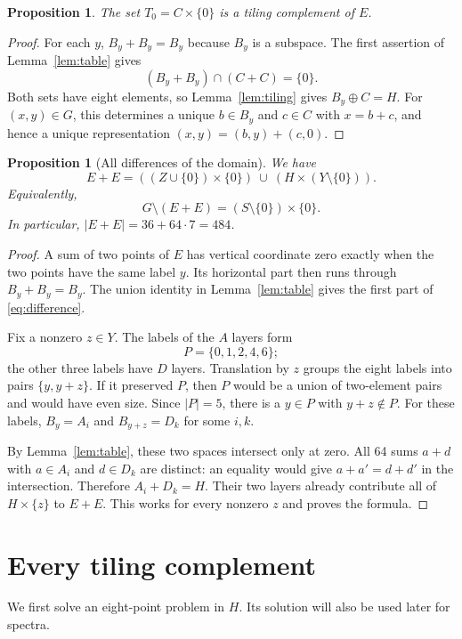 \documentclass[11pt]{article}
\numberwithin{equation}{section}
\newtheorem{proposition}[theorem]{Proposition}
\theoremstyle{definition}
\theoremstyle{remark}\newtheorem{remark}[theorem]{Remark}
\begin{document}
\begin{proposition}\label{prop:tile}
The set $T_0=C\times\{0\}$ is a tiling complement of $E$.
\end{proposition}
\begin{proof}
For each $y$, $B_y+B_y=B_y$ because $B_y$ is a subspace. The first assertion of Lemma~\ref{lem:table} gives
\[
 (B_y+B_y)\cap(C+C)=\{0\}.
\]
Both sets have eight elements, so Lemma~\ref{lem:tiling} gives $B_y\oplus C=H$. For $(x,y)\in G$, this determines a unique $b\in B_y$ and $c\in C$ with $x=b+c$, and hence a unique representation $(x,y)=(b,y)+(c,0)$.
\end{proof}

\begin{proposition}[All differences of the domain]\label{prop:diff}
We have
\begin{equation}\label{eq:difference}
 E+E=((Z\cup\{0\})\times\{0\})
       \ \cup\ (H\times(Y\setminus\{0\})).
\end{equation}
Equivalently,
\begin{equation}\label{eq:missing}
 G\setminus(E+E)=(S\setminus\{0\})\times\{0\}.
\end{equation}
In particular, $|E+E|=36+64\cdot7=484$.
\end{proposition}
\begin{proof}
A sum of two points of $E$ has vertical coordinate zero exactly when the two points have the same label $y$. Its horizontal part then runs through $B_y+B_y=B_y$. The union identity in Lemma~\ref{lem:table} gives the first part of \eqref{eq:difference}.

Fix a nonzero $z\in Y$. The labels of the $A$ layers form
\[
 P=\{0,1,2,4,6\};
\]
the other three labels have $D$ layers. Translation by $z$ groups the eight labels into pairs $\{y,y+z\}$. If it preserved $P$, then $P$ would be a union of two-element pairs and would have even size. Since $|P|=5$, there is a $y\in P$ with $y+z\notin P$. For these labels, $B_y=A_i$ and $B_{y+z}=D_k$ for some $i,k$.

By Lemma~\ref{lem:table}, these two spaces intersect only at zero. All 64 sums $a+d$ with $a\in A_i$ and $d\in D_k$ are distinct: an equality would give $a+a'=d+d'$ in the intersection. Therefore $A_i+D_k=H$. Their two layers already contribute all of $H\times\{z\}$ to $E+E$. This works for every nonzero $z$ and proves the formula.
\end{proof}

\section{Every tiling complement}\label{sec:complements}
We first solve an eight-point problem in $H$. Its solution will also be used later for spectra.
\end{document}
